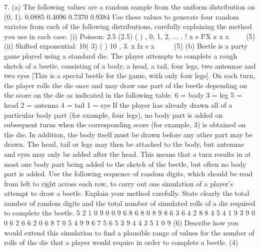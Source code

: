 7. (a) The following values are a random sample from the uniform distribution on
(0, 1).
0.0885 0.4096 0.7370 0.9384
Use these values to generate four random variates from each of the following
distributions, carefully explaining the method you use in each case.
(i) Poisson:
2.5 (2.5) ( ) , 0, 1, 2, ... . !
x e PX x x
x

  (5)
(ii) Shifted exponential: 10( 3) ( ) 10 , 3. x fx e x     (5)
(b) Beetle is a party game played using a standard die. The player attempts to
complete a rough sketch of a beetle, consisting of a body, a head, a tail, four
legs, two antennae and two eyes [This is a special beetle for the game, with
only four legs]. On each turn, the player rolls the die once and may draw one
part of the beetle depending on the score on the die as indicated in the
following table.
6 = body 3 = leg
5 = head 2 = antenna
4 = tail 1 = eye
If the player has already drawn all of a particular body part (for example, four
legs), no body part is added on subsequent turns when the corresponding score
(for example, 3) is obtained on the die. In addition, the body itself must be
drawn before any other part may be drawn. The head, tail or legs may then be
attached to the body, but antennae and eyes may only be added after the head.
This means that a turn results in at most one body part being added to the
sketch of the beetle, but often no body part is added.
Use the following sequence of random digits, which should be read from left to
right across each row, to carry out one simulation of a player's attempt to draw
a beetle. Explain your method carefully. State clearly the total number of
random digits and the total number of simulated rolls of a die required to
complete the beetle.
5 2 1 0 9 0 0 9 6 8 6 8 0 8 9 8 6 3 6 4
2 8 8 4 5 4 1 9 3 9 0 0 6 2 6 6 2 0 6 8
7 0 5 4 9 9 6 7 5 6 5 3 9 4 4 3 5 1 0 9
(6)
Describe how you would extend this simulation to find a plausible range of
values for the number of rolls of the die that a player would require in order to
complete a beetle.
(4) 
